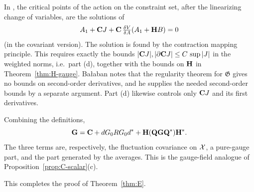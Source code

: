 \begin{remark}
In \cite[(110)--(111)]{BalVar}, the critical points of the action on the constraint set, after the linearizing change of variables, are the solutions of
\[
A_1+\mathbf C J+\mathbf C\,\tfrac{\delta V}{\delta A}(A_1+\mathbf H B)=0
\]
(in the covariant version). The solution is found by the contraction mapping principle. This requires exactly the bounds $|\mathbf C J|,|\partial\mathbf C J|\le C\,\sup|J|$ in the weighted norms, i.e.\ part (d), together with the bounds on $\mathbf H$ in Theorem~\ref{thm:H-gauge}. Ba\l aban notes \cite[Sect.~E]{BalVar} that the regularity theorem for $\mathfrak G$ \cite[Theorem~3.13]{BalBackground} gives no bounds on second-order derivatives, and he supplies the needed second-order bounds by a separate argument. Part (d) likewise controls only $\mathbf C J$ and its first derivatives.
\end{remark}

\begin{remark}
Combining the definitions,
\[
\mathbf G=\mathbf C+dG_0RG_0d^*+\mathbf H(\mathbf Q\mathbf G\mathbf Q^*)\mathbf H^* .
\]
The three terms are, respectively, the fluctuation covariance on $\mathcal X$, a pure-gauge part, and the part generated by the averages. This is the gauge-field analogue of Proposition~\ref{prop:C-scalar}(c).
\end{remark}

This completes the proof of Theorem~\ref{thm:E}.
